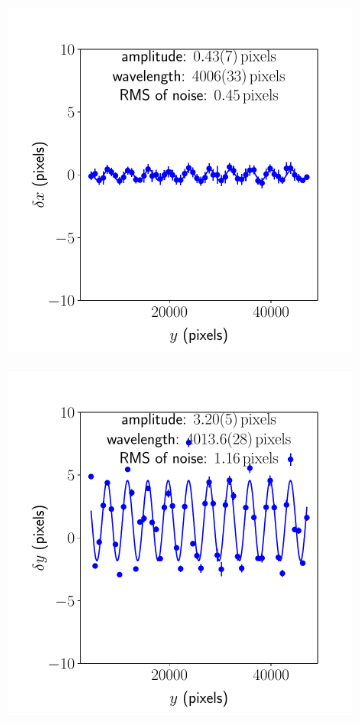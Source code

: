 \documentclass{article}
\begin{document}
\begin{figure}[ht]
\begin{subfigure}{0.24\linewidth}
		\caption{}
		\label{fig:sinewave2yx2}
	\end{subfigure}
	\begin{subfigure}{0.24\linewidth}
		\includegraphics[width=\linewidth]{sine-wave-2-xy-2.pdf}
		\caption{}
		\label{fig:sinewave2xy2}
	\end{subfigure}
	\begin{subfigure}{0.24\linewidth}
		\includegraphics[width=\linewidth]{sine-wave-2-yy-2.pdf}

\end{subfigure}
\end{figure}
\end{document}
